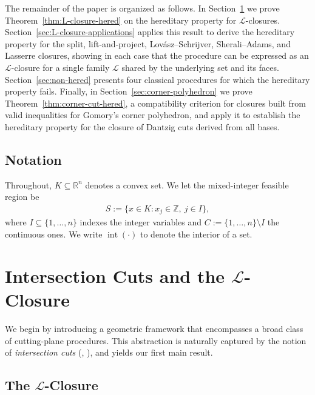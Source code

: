 \documentclass{article}
\newcommand{\Z}{\mathbb{Z}}
\newcommand{\R}{\mathbb{R}}
\renewcommand{\L}{\mathcal{L}}
\begin{document}
The remainder of the paper is organized as follows. In Section~\ref{sec:intersection-cuts} we prove Theorem~\ref{thm:L-closure-hered} on the hereditary property for $\L$-closures. Section~\ref{sec:L-closure-applications} applies this result to derive the hereditary property for the split, lift-and-project, Lov\'asz--Schrijver, Sherali--Adams, and Lasserre closures, showing in each case that the procedure can be expressed as an $\L$-closure for a single family $\L$ shared by the underlying set and its faces. Section~\ref{sec:non-hered} presents four classical procedures for which the hereditary property fails. Finally, in Section~\ref{sec:corner-polyhedron} we prove Theorem~\ref{thm:corner-cut-hered}, a compatibility criterion for closures built from valid inequalities for Gomory's corner polyhedron, and apply it to establish the hereditary property for the closure of Dantzig cuts derived from all bases.

\subsection{Notation} \label{subsec:notation}

Throughout, $K \subseteq \R^n$ denotes a convex set. We let the mixed-integer feasible region be
\begin{align}
    S := \{x \in K : x_j \in \Z,\ j \in I\},
\end{align}
where $I \subseteq \{1,\ldots,n\}$ indexes the integer variables and $C := \{1,\ldots,n\} \setminus I$ the continuous ones. We write $\operatorname{int}(\cdot)$ to denote the interior of a set.

\section{Intersection Cuts and the \texorpdfstring{$\L$}{L}-Closure}
\label{sec:intersection-cuts}

We begin by introducing a geometric framework that encompasses a broad class of cutting-plane procedures. This abstraction is naturally captured by the notion of \emph{intersection cuts} (\cite{balas1971intersection}, \cite{averkov2011finite}), and yields our first main result.

\subsection{The \texorpdfstring{$\L$}{L}-Closure} \label{subsec:L-closure-defn}
\end{document}
